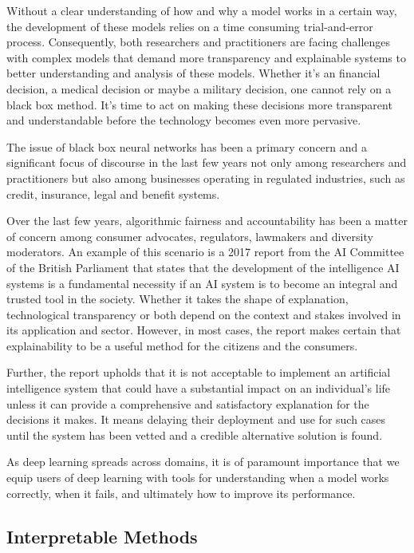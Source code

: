 Without a clear understanding of how and why a model works in a certain way, the development of these models relies on a time consuming trial-and-error process. Consequently, both researchers and practitioners are facing challenges with complex models that demand more transparency and explainable systems to better understanding and analysis of these models. Whether it's an financial decision, a medical decision or maybe a military decision, one cannot rely on a black box method. It's time to act on making these decisions more transparent and understandable before the technology becomes even more pervasive.

The issue of black box neural networks has been a primary concern and a significant focus of discourse in the last few years not only among researchers and practitioners \cite{Samek} but also among businesses operating in regulated industries, such as credit, insurance, legal and benefit systems. 

Over the last few years, algorithmic fairness and accountability has been a matter of concern among consumer advocates, regulators, lawmakers and diversity moderators. An example of this scenario is a 2017 report from the AI Committee of the British Parliament \cite{Hagras2018} that states that the development of the intelligence AI systems is a fundamental necessity if an AI system is to become an integral and trusted tool in the society. Whether it takes the shape of explanation, technological transparency or both depend on the context and stakes involved in its application and sector. However, in most cases, the report makes certain that explainability to be a useful method for the citizens and the consumers. 

Further, the report upholds that it is not acceptable to implement an artificial intelligence system that could have a substantial impact on an individual's life unless it can provide a comprehensive and satisfactory explanation for the decisions it makes. It means delaying their deployment and use for such cases until the system has been vetted and a credible alternative solution is found.

As deep learning spreads across domains, it is of paramount importance that we equip users of deep learning with tools for understanding when a model works correctly, when it fails, and ultimately how to improve its performance.

\subsection{Interpretable Methods}

